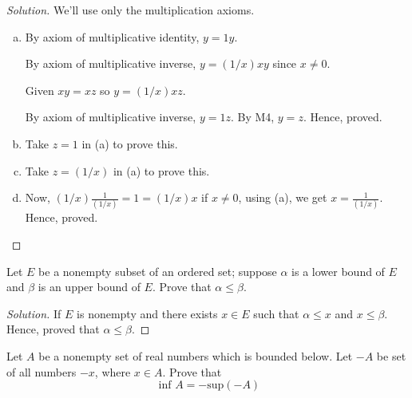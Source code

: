 \begin{proof}[Solution]
	We'll use only the multiplication axioms.
	\begin{enumerate}[a)]
		\item
			By axiom of multiplicative identity, $y = 1y$.

			By axiom of multiplicative inverse, $y = (1/x) x y$ since $x \neq 0$.

			Given $xy = xz$ so $y = (1/x) x z$.

			By axiom of multiplicative inverse, $y = 1z$. By M4, $y = z$. Hence, proved.

		\item Take $z = 1$ in (a) to prove this.
		\item Take $z = (1/x)$ in (a) to prove this.
		\item Now, $(1/x) \frac{1}{(1/x)} = 1 = (1/x) x $ if $x \neq 0$, using (a),
		we get $x = \frac{1}{(1/x)}$. Hence, proved.
	\end{enumerate}
\end{proof}

\begin{prblm}
	Let $E$ be a nonempty subset of an ordered set;
	suppose $\alpha$ is a lower bound of $E$ and $\beta$ is an upper bound of $E$.
	Prove that $\alpha \leq \beta$.
\end{prblm}

\begin{proof}[Solution]
	If $E$ is nonempty and there exists $x \in E$ such that $\alpha \leq x$ and $x \leq \beta$.
	Hence, proved that $\alpha \leq \beta$.
\end{proof}


\begin{prblm}
	Let $A$ be a nonempty set of real numbers which is bounded below.
	Let $-A$ be set of all numbers $-x$, where $x \in A$. Prove that
	$$ \text{ inf } A = - \text{sup}(-A) $$
\end{prblm}

